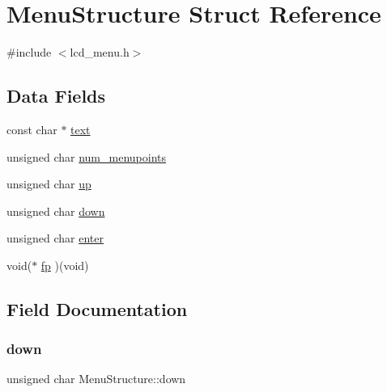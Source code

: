 \hypertarget{struct_menu_structure}{}\section{Menu\+Structure Struct Reference}
\label{struct_menu_structure}


{\ttfamily \#include $<$lcd\+\_\+menu.\+h$>$}

\subsection*{Data Fields}
\begin{DoxyCompactItemize}
\item 
const char $\ast$ \mbox{\hyperlink{struct_menu_structure_a0726774a008bbbd0740ce033cd5b7c7a}{text}}
\item 
unsigned char \mbox{\hyperlink{struct_menu_structure_a03bb2b81933329456adb5a4dd4e6ee68}{num\+\_\+menupoints}}
\item 
unsigned char \mbox{\hyperlink{struct_menu_structure_ac983323a9dfb0e5b141bd9f06c7f2d94}{up}}
\item 
unsigned char \mbox{\hyperlink{struct_menu_structure_a91c52cae9cca9734fd5b116d9624db08}{down}}
\item 
unsigned char \mbox{\hyperlink{struct_menu_structure_a18371001fe83f38e112c2cdb237fe821}{enter}}
\item 
void($\ast$ \mbox{\hyperlink{struct_menu_structure_a9fa7771424c33bfa30bf05f7fdcc4a1a}{fp}} )(void)
\end{DoxyCompactItemize}


\subsection{Field Documentation}
\mbox{\label{struct_menu_structure_a91c52cae9cca9734fd5b116d9624db08}} 
\subsubsection{\texorpdfstring{down}{down}}
{\footnotesize\ttfamily unsigned char Menu\+Structure\+::down}

\mbox{\label{struct_menu_structure_a18371001fe83f38e112c2cdb237fe821}} 
